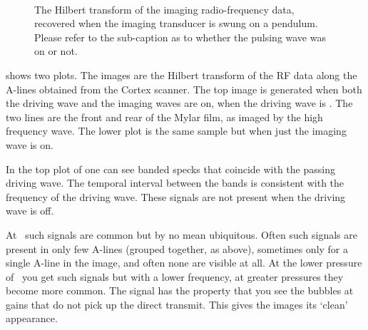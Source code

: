 \begin{figure}[h]
     \centering
 \\
\caption{The Hilbert transform of the imaging radio-frequency data, recovered when the imaging transducer is swung on a pendulum.  Please refer to the sub-caption as to whether the pulsing wave was on or not.}
\label{fig:water_cavitation_prelim}
\end{figure}



 shows two plots.
The images are the Hilbert transform of the RF data along the A-lines obtained from the Cortex scanner.
%
The top image is generated when both the driving wave and the imaging waves are on,
when the driving wave is \dbThirty.
The two lines are the front and rear of the Mylar film, as imaged by the high frequency wave.
The lower plot is the same sample but when just the imaging wave is on.


In the top plot of  one can see banded specks that coincide  with the passing  driving wave.  
The temporal interval between the bands is consistent with the frequency of the driving wave.
These signals are not present when the driving wave is off. %

At \dbThirty\  such signals are  common but by no mean ubiquitous.
Often such signals are present in only  few A-lines (grouped together, as above), sometimes only for a single A-line in the image, and often none are visible at all.
At the lower pressure of \dbThirtyTwo\ you get such signals but with a lower frequency,
at greater pressures they become more common.
The \dbThirty signal has the property that you see  the bubbles at gains that  do not pick up the direct transmit.
This gives the images its `clean' appearance.

